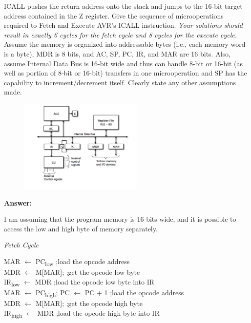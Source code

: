 \documentclass[12pt,letterpaper]{article}
\begin{document}
\begin{enumerate}
	ICALL pushes the return address onto the stack and jumps to the 16-bit target address contained in the Z register. 
	Give the sequence of microoperations required to Fetch and Execute AVR’s ICALL instruction.
	\textit{Your solutions should result in exactly 6 cycles for the fetch cycle and 8 cycles for the execute cycle.} 
	Assume the memory is organized into addressable bytes (i.e., each memory word is a byte), MDR is 8 bits, and AC, SP, PC, IR, and MAR are 16 bits. 
	Also, assume Internal Data Bus is 16-bit wide and thus can handle 8-bit or 16-bit (as well as portion of 8-bit or 16-bit) transfers in one microoperation and SP has the capability to increment/decrement itself. 
	Clearly state any other assumptions made.
	\begin{figure}[h]
		\centering
		\includegraphics[width=0.55\textwidth]{Q1.png}
	\end{figure}
	 
	 
	\textbf{Answer:}
	
	I am assuming that the program memory is 16-bits wide, and it is possible to access the low and high byte of memory separately.
	
	
	\begin{center}
		\textit{Fetch Cycle}
	\end{center}
		
	
	
	MAR $\leftarrow$ PC\textsubscript{low} 				\hfill ;load the opcode address
	\\
	MDR $\leftarrow$ M[MAR]; 	\hfill ;get the opcode low byte
	\\
	IR\textsubscript{low} $\leftarrow$ MDR 				\hfill ;load the opcode low byte  into IR
	\\
	MAR $\leftarrow$ PC\textsubscript{high}; PC $\leftarrow$ PC + 1					\hfill ;load the opcode address
	\\
	MDR $\leftarrow$ M[MAR];	\hfill  ;get the opcode high byte
	\\
	IR\textsubscript{high} $\leftarrow$ MDR 				\hfill ;load the opcode high byte into IR
	

\end{enumerate}
\end{document}
